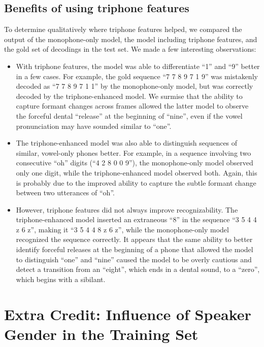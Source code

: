 \documentclass[twocolumn, 11pt]{article}
\begin{document}
\subsection{Benefits of using triphone features}
To determine qualitatively where triphone features helped, we compared the output
of the monophone-only model, the model including triphone features, and the gold
set of decodings in the test set. We made a few interesting observations:

\begin{itemize}
  \item With triphone features, the model was able to differentiate ``1'' and
  ``9'' better in a few cases. For example, the gold sequence ``7 7 8 9 7 1 9''
  was mistakenly decoded as ``7 7 8 9 7 1 1'' by the monophone-only model, but
  was correctly decoded by the triphone-enhanced model. We surmise that the
  ability to capture formant changes across frames allowed the latter model to
  observe the forceful dental ``release'' at the beginning of ``nine'', even if
  the vowel pronunciation may have sounded similar to ``one''.
  \item The triphone-enhanced model was also able to distinguish sequences of
  similar, vowel-only phones better. For example, in a sequence involving two
  consecutive ``oh'' digits (``4 2 8 0 0 9''), the monophone-only model observed
  only one digit, while the triphone-enhanced model observed both. Again, this
  is probably due to the improved ability to capture the subtle formant change
  between two utterances of ``oh''.
  \item However, triphone features did not always improve recognizability. The
  triphone-enhanced model inserted an extraneous ``8'' in the sequence ``3 5 4 4
  z 6 z'', making it ``3 5 4 4 8 z 6 z'', while the monophone-only model
  recognized the sequence correctly. It appears that the same ability to better
  identify forceful releases at the beginning of a phone that allowed the model
  to distinguish ``one'' and ``nine'' caused the model to be overly cautious and
  detect a transition from an ``eight'', which ends in a dental sound, to a
  ``zero'', which begins with a sibilant.
\end{itemize}

\section{Extra Credit: Influence of Speaker Gender in the Training Set}
\end{document}
